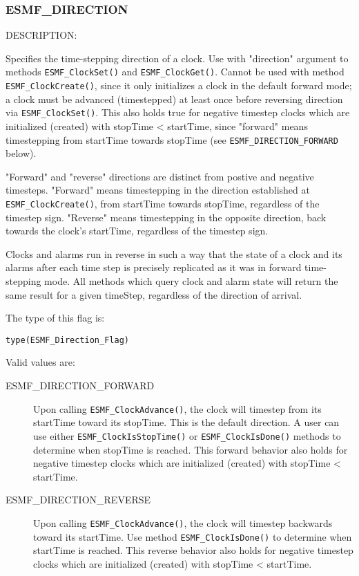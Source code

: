 
\subsubsection{ESMF\_DIRECTION}
\label{const:direction}

{\sf DESCRIPTION:\\}
\begin{sloppypar}
Specifies the time-stepping direction of a clock.  Use with "direction"
argument to methods {\tt ESMF\_ClockSet()} and {\tt ESMF\_ClockGet()}.
Cannot be used with method {\tt ESMF\_ClockCreate()}, since it only
initializes a clock in the default forward mode; a clock must be advanced
(timestepped) at least once before reversing direction via
{\tt ESMF\_ClockSet()}.  This also holds true for negative timestep clocks
which are initialized (created) with stopTime < startTime, since "forward"
means timestepping from startTime towards stopTime
(see {\tt ESMF\_DIRECTION\_FORWARD} below).
\end{sloppypar}

"Forward" and "reverse" directions are distinct from postive and negative
timesteps.  "Forward" means timestepping in the direction established at
{\tt ESMF\_ClockCreate()}, from startTime towards stopTime, regardless
of the timestep sign.  "Reverse" means timestepping in the opposite direction,
back towards the clock's startTime, regardless of the timestep sign.

Clocks and alarms run in reverse in such a way that the state of a clock and
its alarms after each time step is precisely replicated as it was in forward
time-stepping mode.  All methods which query clock and alarm state will
return the same result for a given timeStep, regardless of the direction of
arrival.

The type of this flag is:

{\tt type(ESMF\_Direction\_Flag)}

Valid values are:
\begin{description}

\item [ESMF\_DIRECTION\_FORWARD] 
      Upon calling {\tt ESMF\_ClockAdvance()}, the clock will timestep from
its startTime toward its stopTime.  This is the default direction.  A user
can use either {\tt ESMF\_ClockIsStopTime()} or {\tt ESMF\_ClockIsDone()}
methods to determine when stopTime is reached.  This forward behavior also
holds for negative timestep clocks which are initialized (created) with
stopTime < startTime.

\item [ESMF\_DIRECTION\_REVERSE] 
      Upon calling {\tt ESMF\_ClockAdvance()}, the clock will timestep backwards
toward its startTime.  Use method {\tt ESMF\_ClockIsDone()} to determine when
startTime is reached.  This reverse behavior also holds for negative timestep
clocks which are initialized (created) with stopTime < startTime.

\end{description}

